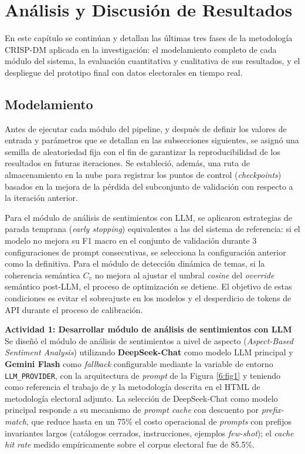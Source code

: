 \chapter{Análisis y Discusión de Resultados}

En este capítulo se continúan y detallan las últimas tres fases de la metodología
CRISP-DM aplicada en la investigación: el modelamiento completo de cada módulo del
sistema, la evaluación cuantitativa y cualitativa de sus resultados, y el despliegue
del prototipo final con datos electorales en tiempo real.

\section{Modelamiento}

Antes de ejecutar cada módulo del pipeline, y después de definir los valores de
entrada y parámetros que se detallan en las subsecciones siguientes, se asignó una
semilla de aleatoriedad fija con el fin de garantizar la reproducibilidad de los
resultados en futuras iteraciones. Se estableció, además, una ruta de almacenamiento
en la nube para registrar los puntos de control (\textit{checkpoints}) basados en la
mejora de la pérdida del subconjunto de validación con respecto a la iteración
anterior.

Para el módulo de análisis de sentimientos con LLM, se aplicaron estrategias de
parada temprana (\textit{early stopping}) equivalentes a las del sistema de referencia:
si el modelo no mejora su F1 macro en el conjunto de validación durante 3 configuraciones
de prompt consecutivas, se selecciona la configuración anterior como la definitiva.
Para el módulo de detección dinámica de temas, si la coherencia semántica $C_v$ no
mejora al ajustar el umbral \textit{cosine} del \textit{override} semántico post-LLM,
el proceso de optimización se detiene. El objetivo
de estas condiciones es evitar el sobreajuste en los modelos y el desperdicio de tokens
de API durante el proceso de calibración.

\textbf{Actividad 1: Desarrollar módulo de análisis de sentimientos con LLM}
\\
Se diseñó el módulo de análisis de sentimientos a nivel de aspecto (\textit{Aspect-Based
Sentiment Analysis}) utilizando \textbf{DeepSeek-Chat} como modelo LLM principal y
\textbf{Gemini Flash} como \textit{fallback} configurable mediante la variable de
entorno \texttt{LLM\_PROVIDER}, con la arquitectura de \textit{prompt} de la
Figura \ref{6:fig1} y teniendo como referencia el trabajo de
\cite{pr_alvarez2023llm_political} y la metodología descrita en el HTML de
metodología electoral adjunto. La selección de DeepSeek-Chat como modelo principal
responde a su mecanismo de \textit{prompt cache} con descuento por
\textit{prefix-match}, que reduce hasta en un 75\% el costo operacional de
\textit{prompts} con prefijos invariantes largos (catálogos cerrados, instrucciones,
ejemplos \textit{few-shot}); el \textit{cache hit rate} medido empíricamente sobre
el corpus electoral fue de 85.5\%.

